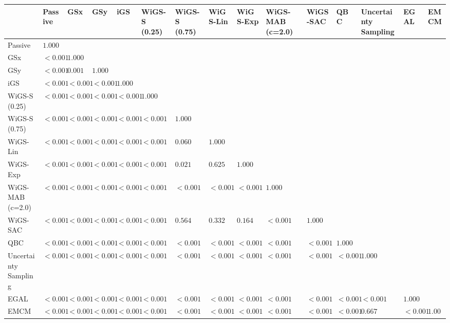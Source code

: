 \begin{tabular}{lllllllllllllll}
\toprule
 & Passive & GSx & GSy & iGS & WiGS-S (0.25) & WiGS-S (0.75) & WiGS-Lin & WiGS-Exp & WiGS-MAB (c=2.0) & WiGS-SAC & QBC & Uncertainty Sampling & EGAL & EMCM \\
\midrule
Passive & $1.000$ &  &  &  &  &  &  &  &  &  &  &  &  &  \\
GSx & $<0.001$ & $1.000$ &  &  &  &  &  &  &  &  &  &  &  &  \\
GSy & $<0.001$ & $0.001$ & $1.000$ &  &  &  &  &  &  &  &  &  &  &  \\
iGS & $<0.001$ & $<0.001$ & $<0.001$ & $1.000$ &  &  &  &  &  &  &  &  &  &  \\
WiGS-S (0.25) & $<0.001$ & $<0.001$ & $<0.001$ & $<0.001$ & $1.000$ &  &  &  &  &  &  &  &  &  \\
WiGS-S (0.75) & $<0.001$ & $<0.001$ & $<0.001$ & $<0.001$ & $<0.001$ & $1.000$ &  &  &  &  &  &  &  &  \\
WiGS-Lin & $<0.001$ & $<0.001$ & $<0.001$ & $<0.001$ & $<0.001$ & $0.060$ & $1.000$ &  &  &  &  &  &  &  \\
WiGS-Exp & $<0.001$ & $<0.001$ & $<0.001$ & $<0.001$ & $<0.001$ & $0.021$ & $0.625$ & $1.000$ &  &  &  &  &  &  \\
WiGS-MAB (c=2.0) & $<0.001$ & $<0.001$ & $<0.001$ & $<0.001$ & $<0.001$ & $<0.001$ & $<0.001$ & $<0.001$ & $1.000$ &  &  &  &  &  \\
WiGS-SAC & $<0.001$ & $<0.001$ & $<0.001$ & $<0.001$ & $<0.001$ & $0.564$ & $0.332$ & $0.164$ & $<0.001$ & $1.000$ &  &  &  &  \\
QBC & $<0.001$ & $<0.001$ & $<0.001$ & $<0.001$ & $<0.001$ & $<0.001$ & $<0.001$ & $<0.001$ & $<0.001$ & $<0.001$ & $1.000$ &  &  &  \\
Uncertainty Sampling & $<0.001$ & $<0.001$ & $<0.001$ & $<0.001$ & $<0.001$ & $<0.001$ & $<0.001$ & $<0.001$ & $<0.001$ & $<0.001$ & $<0.001$ & $1.000$ &  &  \\
EGAL & $<0.001$ & $<0.001$ & $<0.001$ & $<0.001$ & $<0.001$ & $<0.001$ & $<0.001$ & $<0.001$ & $<0.001$ & $<0.001$ & $<0.001$ & $<0.001$ & $1.000$ &  \\
EMCM & $<0.001$ & $<0.001$ & $<0.001$ & $<0.001$ & $<0.001$ & $<0.001$ & $<0.001$ & $<0.001$ & $<0.001$ & $<0.001$ & $<0.001$ & $0.667$ & $<0.001$ & $1.000$ \\
\bottomrule
\end{tabular}
